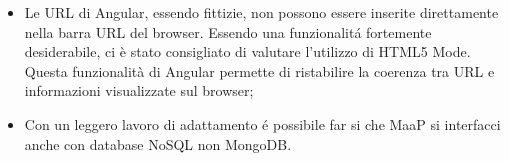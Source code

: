 \begin{itemize}
\item Le URL di Angular, essendo fittizie, non possono essere inserite direttamente nella barra URL del browser. Essendo una funzionalit\'{a} fortemente desiderabile, ci è stato consigliato di valutare l'utilizzo di HTML5 Mode. Questa funzionalità di Angular permette di ristabilire la coerenza tra URL e informazioni visualizzate sul browser;
\item Con un leggero lavoro di adattamento \'{e} possibile far si che MaaP si interfacci anche con database NoSQL non MongoDB.
\end{itemize}






